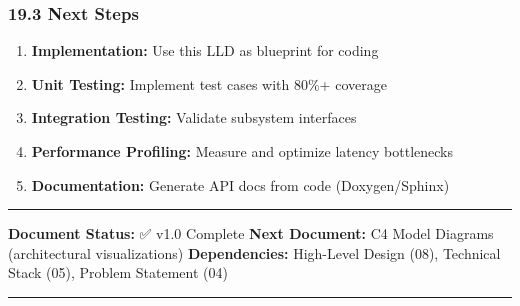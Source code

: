 \documentclass[
]{article}
\providecommand{\tightlist}{%
  \setlength{\itemsep}{0pt}\setlength{\parskip}{0pt}}
\begin{document}
\hypertarget{next-steps}{%
\subsubsection{19.3 Next Steps}\label{next-steps}}

\begin{enumerate}
\def\labelenumi{\arabic{enumi}.}
\tightlist
\item
  \textbf{Implementation:} Use this LLD as blueprint for coding
\item
  \textbf{Unit Testing:} Implement test cases with 80\%+ coverage
\item
  \textbf{Integration Testing:} Validate subsystem interfaces
\item
  \textbf{Performance Profiling:} Measure and optimize latency
  bottlenecks
\item
  \textbf{Documentation:} Generate API docs from code (Doxygen/Sphinx)
\end{enumerate}

\begin{center}\rule{0.5\linewidth}{0.5pt}\end{center}

\textbf{Document Status:} ✅ v1.0 Complete \textbf{Next Document:} C4
Model Diagrams (architectural visualizations) \textbf{Dependencies:}
High-Level Design (08), Technical Stack (05), Problem Statement (04)

\begin{center}\rule{0.5\linewidth}{0.5pt}\end{center}
\end{document}
